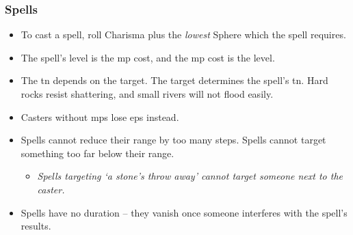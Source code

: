 \subsubsection*{Spells}
\begin{itemize}
  \item
  To cast a spell, roll Charisma plus the \emph{lowest} Sphere which the spell requires.
  \item
  The spell's level is the \gls{mp} cost, and the \gls{mp} cost is the level.
  \item
  The \gls{tn} depends on the target.
  The target determines the spell's \gls{tn}.
  Hard rocks resist shattering, and small rivers will not flood easily.
  \item
  Casters without \glspl{mp} lose \glspl{ep} instead.
  \item
  Spells cannot reduce their range by too many \glspl{step}.
  Spells cannot target something too far below their range.
  \begin{itemize}
    \item
    \textit{Spells targeting `a stone's throw away' cannot target someone next to the caster.}
  \end{itemize}
  \item
  Spells have no duration -- they vanish once someone interferes with the spell's results.
\end{itemize}

